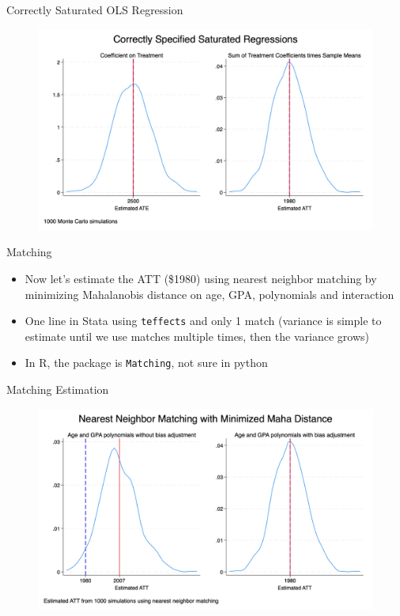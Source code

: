 \documentclass{beamer}
\begin{document}
\begin{frame}{Correctly Saturated OLS Regression}

\begin{figure}[!t]\centering
\includegraphics[scale=0.1]{./lecture_includes/combined_saturated2.jpg}
\end{figure}

\end{frame}


\begin{frame}{Matching}

\begin{itemize}

\item Now let's estimate the ATT (\$1980) using nearest neighbor matching by minimizing Mahalanobis distance on age, GPA, polynomials and interaction
\item One line in Stata using \texttt{teffects} and only 1 match (variance is simple to estimate until we use matches multiple times, then the variance grows)
\item In R, the package is \texttt{Matching}, not sure in python
\end{itemize}

\end{frame}


\begin{frame}{Matching Estimation}

\begin{figure}[!t]\centering
\includegraphics[scale=0.1]{./lecture_includes/combined_kernels_maha.jpg}
\end{figure}

\end{frame}
\end{document}
